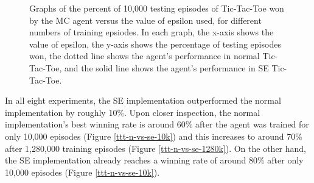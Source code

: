 \documentclass[11pt,a4paper,twoside,openright]{report}
\begin{document}
\begin{figure}

    \caption{Graphs of the percent of 10,000 testing episodes of Tic-Tac-Toe won by the MC agent versus the value of epsilon used, for different numbers of training epsiodes. In each graph, the x-axis shows the value of epsilon, the y-axis shows the percentage of testing episodes won, the dotted line shows the agent's performance in normal Tic-Tac-Toe, and the solid line shows the agent's performance in SE Tic-Tac-Toe.}
    \label{fig:tictactoe-normal-vs-symmetric-equality-epsilon}
\end{figure}

In all eight experiments, the SE implementation outperformed the normal implementation by roughly 10\%. Upon closer inspection, the normal implementation's best winning rate is around 60\% after the agent was trained for only 10,000 episodes (Figure \ref{ttt-n-vs-se-10k}) and this increases to around 70\% after 1,280,000 training episodes (Figure \ref{ttt-n-vs-se-1280k}). On the other hand, the SE implementation already reaches a winning rate of around 80\% after only 10,000 episodes (Figure \ref{ttt-n-vs-se-10k}).
\end{document}
